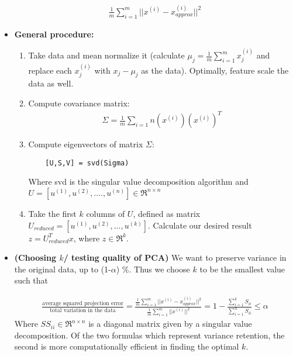 \documentclass[titlepage]{article}
\begin{document}
\begin{itemize}
\begin{align*}
	\frac{1}{m} \sum_{i=1}^{m} ||x^{(i)} - x_{approx}^{(i)} ||^2
\end{align*}

\item \textbf{General procedure:}
\begin{enumerate}
	\item Take data and mean normalize it (calculate $\mu_j = \frac{1}{m}\sum_{i=1}^m x_j^{(i)}$ and replace each $x_j^{(i)}$ with $x_j - \mu_j$ as the data). Optimally, feature scale the data as well.
	\item Compute covariance matrix:
	\begin{align*}
		\Sigma = \frac{1}{m} \sum_{i=1}{n} (x^{(i)})(x^{(i)})^T
	\end{align*}
	\item Compute eigenvectors of matrix $\Sigma$:
	\begin{verbatim}
	[U,S,V] = svd(Sigma)
	\end{verbatim}
	Where svd is the singular value decomposition algorithm and $U = [u^{(1)}, u^{(2)},....,u^{(n)}] \in \Re^{n \times n}$
	\item Take the first $k$ columns of $U$, defined as matrix $U_{reduced} = [u^{(1)}, u^{(2)},..., u^{(k)}]$.
	Calculate our desired result $z = U_{reduced}^T x$, where $z \in \Re^k$.
\end{enumerate}

\item \textbf{(Choosing $k$/ testing quality of PCA)} We want to preserve variance in the original data, up to (1-$\alpha$) \%. Thus we choose $k$ to be the smallest value such that

\begin{align*}
	\frac{\text{average squared projection error}}{\text{total variation in the data}} = \frac{ \frac{1}{m}
		\sum_{i=1}^{m} || x^{(i)} - x_{approx}^{(i)}||^2}{\frac{1}{m}\sum_{i=1}^{m}||x^{(i)}||^2} = 1 - 
	\frac{\sum_{i=1}^k S_{ii}}{\sum_{i=1}^{n} S_{ii}} \leq \alpha
\end{align*}
Where $SS_{ii} \in \Re^{n\times n}$ is a diagonal matrix given by a singular value decomposition. Of the two formulas which represent variance retention, the second is more computationally efficient in finding the optimal $k$.


\end{itemize}
\end{document}
